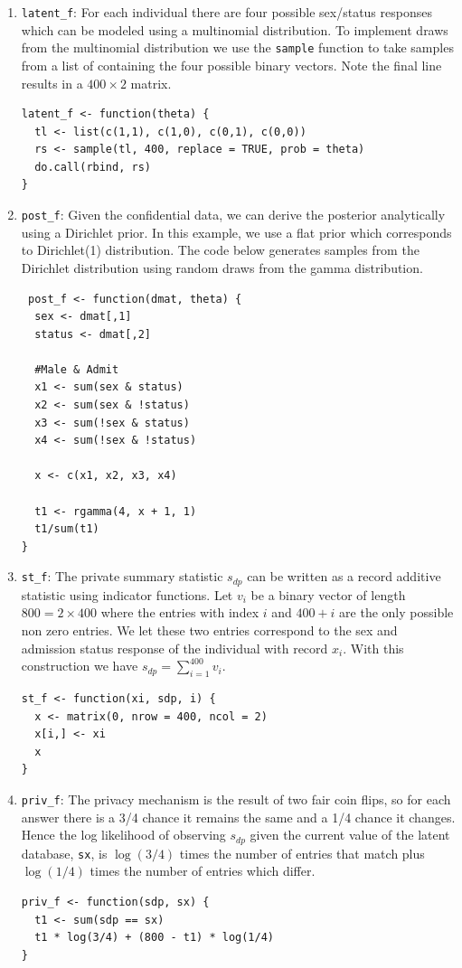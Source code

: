 \begin{enumerate}
\def\labelenumi{\arabic{enumi}.}
\item
  \texttt{latent\_f}: For each individual there are four possible
  sex/status responses which can be modeled using a multinomial distribution.
  To implement draws from the multinomial distribution we use the \texttt{sample} function
  to take samples from a list of containing the four possible binary vectors. Note
  the final line results in a \(400 \times 2\) matrix.

\begin{verbatim}
latent_f <- function(theta) {
  tl <- list(c(1,1), c(1,0), c(0,1), c(0,0))
  rs <- sample(tl, 400, replace = TRUE, prob = theta)
  do.call(rbind, rs)
}
\end{verbatim}
\item
  \texttt{post\_f}: Given the confidential data, we can derive the posterior analytically
  using a Dirichlet prior. In this example, we use a flat prior which
  corresponds to Dirichlet(1) distribution. The code below generates samples from the Dirichlet distribution
  using random draws from the gamma distribution.

\begin{verbatim}
 post_f <- function(dmat, theta) {
  sex <- dmat[,1]
  status <- dmat[,2]

  #Male & Admit
  x1 <- sum(sex & status)
  x2 <- sum(sex & !status)
  x3 <- sum(!sex & status)
  x4 <- sum(!sex & !status)

  x <- c(x1, x2, x3, x4)

  t1 <- rgamma(4, x + 1, 1)
  t1/sum(t1)
}
\end{verbatim}
\item
  \texttt{st\_f}: The private summary statistic \(s_{dp}\) can be written as a record additive
  statistic using indicator functions. Let \(v_i\) be a binary vector of length \(800 = 2 \times 400\)
  where the entries with index \(i\) and \(400 + i\) are the only possible non zero entries.
  We let these two entries correspond to the sex and admission status response of
  the individual with record \(x_i\). With this construction we have \(s_{dp} = \sum_{i=1}^{400} v_i\).

\begin{verbatim}
st_f <- function(xi, sdp, i) {
  x <- matrix(0, nrow = 400, ncol = 2)
  x[i,] <- xi
  x
}
\end{verbatim}
\item
  \texttt{priv\_f}: The privacy mechanism is the result of two fair coin flips, so for
  each answer there is a 3/4 chance it remains the same and a 1/4 chance it changes.
  Hence the log likelihood of observing \(s_{dp}\) given the current value of the latent
  database, \texttt{sx}, is \(\log(3/4)\) times the number of entries that match plus \(\log(1/4)\) times
  the number of entries which differ.

\begin{verbatim}
priv_f <- function(sdp, sx) {
  t1 <- sum(sdp == sx)
  t1 * log(3/4) + (800 - t1) * log(1/4)
}
\end{verbatim}
\end{enumerate}

